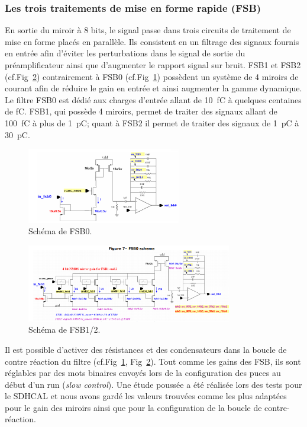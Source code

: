\subsubsection{Les trois traitements de mise en forme rapide (FSB)}
En sortie du miroir à \num{8} bits, le signal passe dans trois circuits de traitement de mise en forme placés en parallèle. Ils consistent en un filtrage des signaux fournis en entrée afin d'éviter les perturbations dans le signal de sortie du préamplificateur ainsi que d'augmenter le rapport signal sur bruit. FSB1 et FSB2 (cf.Fig~\ref{fsb1}) contrairement à FSB0 (cf.Fig~\ref{fsb0}) possèdent un système de \num{4} miroirs de courant afin de réduire le gain en entrée et ainsi augmenter la gamme dynamique. Le filtre FSB0 est dédié aux charges d'entrée allant de \SI{10}{\femto\coulomb} à quelques centaines de \si{\femto\coulomb}. FSB1, qui possède \num{4} miroirs, permet de traiter des signaux allant de \SI{100}{\femto\coulomb} à plus de \SI{1}{\pico\coulomb}; quant à FSB2 il permet de traiter des signaux de \SI{1}{\pico\coulomb} à \SI{30}{\pico\coulomb}.

\begin{figure}[ht!]
	\centering
	\includegraphics[width=0.60\textwidth]{GLA/FSB0.png}
	\captionsetup{type=figure}\caption{Schéma de FSB0.}
	\label{fsb0}
\end{figure}

\begin{figure}[ht!]
	\centering
	\includegraphics[width=0.8\textwidth]{GLA/FSB1.png}
	\captionsetup{type=figure}\caption{Schéma de FSB1/2.}
	\label{fsb1}
\end{figure}

Il est possible d'activer des résistances et des condensateurs dans la boucle de contre réaction du filtre (cf.Fig~\ref{fsb0}, Fig~\ref{fsb1}). Tout comme les gains des FSB, ils sont réglables par des mots binaires envoyés lors de la configuration des puces au début d'un run (\textit{slow control}). Une étude poussée a été réalisée lors des tests pour le SDHCAL et nous avons gardé les valeurs trouvées comme les plus adaptées pour le gain des miroirs ainsi que pour la configuration de la boucle de contre-réaction.

